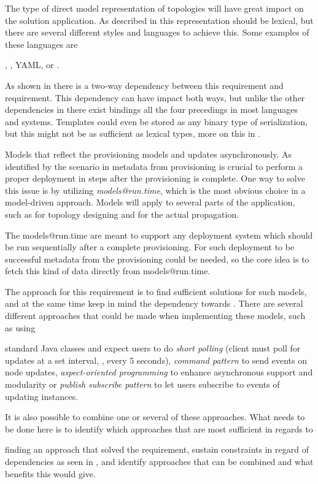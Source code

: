 The type of direct model representation of topologies will have great impact 
on the solution application.
As described in  this representation should be lexical,
but there are several different styles and languages to achieve this.
Some examples of these languages are 
\begin{ii}
  \iitem {},
  \iitem {},
  \iitem YAML,
  \iitem {} or
  \iitem {}.
\end{ii}
As shown in  there is a two-way dependency between 
this requirement and  requirement.
This dependency can have impact both ways, but unlike the other dependencies in
 there exist bindings all the four precedings in
most languages and systems.
Templates could even be stored as any binary type of serialization, 
but this might not be as sufficient as lexical types, more on this
in .

Models that reflect the provisioning models and updates asynchronously. 
As identified by the scenario in  metadata from provisioning is crucial to perform
a proper deployment in steps after the provisioning is complete.
One way to solve this issue is by utilizing \emph{models@run.time}, which is the most obvious choice in a
model-driven approach.
Models will apply to several parts of the application, such as for topology designing and for the actual propagation.

The models@run.time are meant to support any deployment system which should
be run sequentially after a complete provisioning.
For such deployment to be successful metadata from the provisioning could be needed,
so the core idea is to fetch this kind of data directly from models@run.time.

The approach for this requirement is to find sufficient solutions for such models,
and at the same time keep in mind the dependency towards .
There are several different approaches that could be made when implementing 
these models, such as using
\begin{ii}
  \iitem standard Java classes and expect users to do \emph{short polling} (client 
  must poll for updates at a set interval, \eg, every 5 seconds),
  \iitem \emph{command pattern} to send events on node updates,
  \iitem \emph{aspect-oriented programming} to enhance asynchronous support and modularity or
  \iitem \emph{publish subscribe pattern} to let users subscribe to events of updating instances.
\end{ii}
It is also possible to combine one or several of these approaches.
What needs to be done here is to identify which approaches that are most sufficient 
in regards to 
\begin{ii} 
  \iitem finding an approach that solved the requirement,
  \iitem sustain constraints in regard of dependencies as seen in , and
  \iitem identify approaches that can be combined and what benefits this would give.
\end{ii} 

